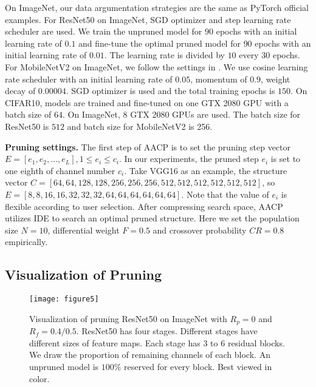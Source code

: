 \documentclass[final]{cvpr}
\begin{document}
On ImageNet, our data argumentation strategies are the same as PyTorch \cite{paszke2017automatic} official examples. 
For ResNet50 on ImageNet, SGD optimizer and step learning rate scheduler are used. 
We train the unpruned model for $90$ epochs with an initial learning rate of $0.1$ and fine-tune the 
optimal pruned model for $90$ epochs with an initial learning rate of $0.01$. The learning rate 
is divided by $10$ every $30$ epochs. 
For MobileNetV2 on ImageNet, we follow the settings in \cite{wang2019pruning}.
We use cosine learning rate scheduler with an initial learning rate of $0.05$, momentum of $0.9$, weight decay of $0.00004$.    
SGD optimizer is used and the total training epochs is $150$.
On CIFAR10, models are trained and fine-tuned on one GTX 2080 GPU with a batch size of $64$. 
On ImageNet, 8 GTX 2080 GPUs are used. The batch size for ResNet50 is $512$ and batch size for MobileNetV2 is 256.

\textbf{Pruning settings.} The first step of AACP is to set the pruning step vector 
$E=[e_1,e_2,...,e_L],1 \leq e_i \leq c_i$. In our experiments, the pruned step $e_i$ is set to one eighth 
of channel number $c_i$. Take VGG16 as an example, the structure vector $C=[64,64,128,128,256,256,256,512,512,512,
512,512,512]$, so $E=[8,8,16,16,32,32,32,64,64,64,64,64,64]$. Note that the value of $e_i$ is flexible according 
to user selection. After compressing search space, AACP utilizes IDE to search an optimal pruned structure. 
Here we set the population size $N=10$, differential weight $F=0.5$ and crossover probability $CR=0.8$ empirically.

\subsection{Visualization of Pruning}

\begin{figure}[t]
    \centering
    \texttt{[image: figure5]} %
    \caption{
        Visualization of pruning ResNet50 on ImageNet with $R_p = 0$ and $R_f=0.4/0.5$. ResNet50 has four stages. Different stages have different sizes of 
        feature maps. Each stage has $3$ to $6$ residual blocks. We draw the proportion of remaining channels of each block. An unpruned model is $100\%$ reserved for every block. 
        Best viewed in color.
    }
    \label{fig5}
\end{figure}
\end{document}
